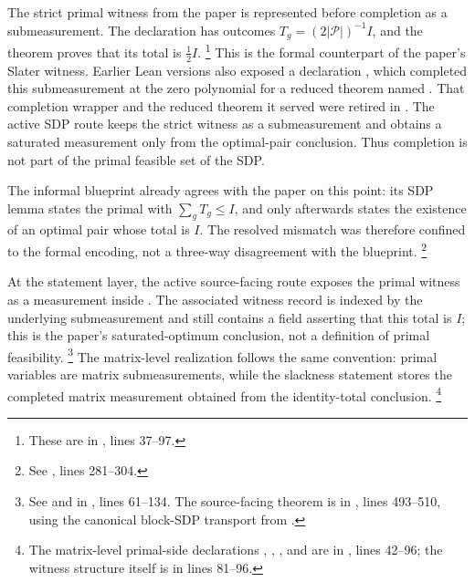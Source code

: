 \documentclass[11pt]{article}
\newcommand{\cP}{\mathcal P}
\begin{document}
The strict primal witness from the paper is represented before completion as a
submeasurement. The declaration  has outcomes
$T_g=(2|\cP|)^{-1}I$, and the theorem
 proves that its total is $\frac12 I$.
\footnote{These are in
, lines 37--97.}
This is the formal counterpart of the paper's Slater witness. Earlier Lean
versions also exposed a declaration , which completed
this submeasurement at the zero polynomial for a reduced theorem named
.  That completion wrapper and the reduced theorem it served were
retired in .  The active SDP route keeps the strict witness as a
submeasurement and obtains a saturated measurement only from the optimal-pair
conclusion.  Thus completion is not part of the primal feasible set of the SDP.

The informal blueprint already agrees with the paper on this point: its SDP
lemma states the primal with $\sum_g T_g\le I$, and only afterwards states the
existence of an optimal pair whose total is $I$. The resolved mismatch was
therefore confined to the formal encoding, not a three-way disagreement with the
blueprint.
\footnote{See , lines
281--304.}

At the statement layer, the active source-facing route exposes the primal
witness as a measurement inside
. The associated witness record is
indexed by the underlying submeasurement and still contains a field
 asserting that this total is $I$; this is the
paper's saturated-optimum conclusion, not a definition of primal feasibility.
\footnote{See
 and
 in
, lines 61--134.
The source-facing theorem is
 in
,
lines 493--510, using the canonical block-SDP transport from
.}
The matrix-level realization follows the same convention: primal variables are
matrix submeasurements, while the slackness statement stores the completed
matrix measurement obtained from the identity-total conclusion.
\footnote{The matrix-level primal-side declarations
, ,
, and 
are in , lines
42--96; the witness structure itself is in lines 81--96.}
\end{document}
